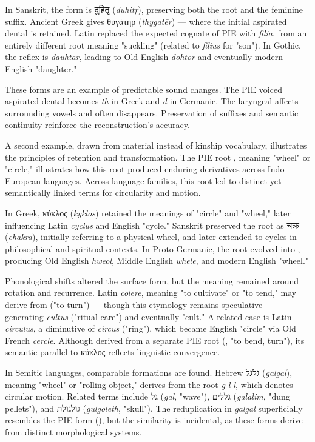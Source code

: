 In Sanskrit, the form is \textsanskrit{दुहितृ} (\emph{duhitṛ}), preserving both the root and the feminine suffix. Ancient Greek gives \textgreek{θυγάτηρ} (\emph{thygatēr}) — where the initial aspirated dental is retained. Latin replaced the expected cognate of PIE  with \emph{filia}, from an entirely different root meaning "suckling" (related to \emph{filius} for "son"). In Gothic, the reflex is \emph{dauhtar}, leading to Old English \emph{dohtor} and eventually modern English "daughter."

These forms are an example of predictable sound changes. The PIE voiced aspirated dental  becomes \emph{th} in Greek and \emph{d} in Germanic. The laryngeal  affects surrounding vowels and often disappears. Preservation of suffixes and semantic continuity reinforce the reconstruction's accuracy.

A second example, drawn from material instead of kinship vocabulary, illustrates the principles of retention and transformation. The PIE root , meaning "wheel" or "circle," illustrates how this root produced enduring derivatives across Indo-European languages. Across language families, this root led to distinct yet semantically linked terms for circularity and motion.

In Greek, \textgreek{κύκλος} (\emph{kyklos}) retained the meanings of "circle" and "wheel," later influencing Latin \emph{cyclus} and English "cycle." Sanskrit preserved the root as \textsanskrit{चक्र} (\emph{chakra}), initially referring to a physical wheel, and later extended to cycles in philosophical and spiritual contexts. In Proto-Germanic, the root evolved into , producing Old English \emph{hweol}, Middle English \emph{whele}, and modern English "wheel."

Phonological shifts altered the surface form, but the meaning remained around rotation and recurrence. Latin \emph{colere}, meaning "to cultivate" or "to tend," may derive from  ("to turn") — though this etymology remains speculative — generating \emph{cultus} ("ritual care") and eventually "cult." A related case is Latin \emph{circulus}, a diminutive of \emph{circus} ("ring"), which became English "circle" via Old French \emph{cercle}. Although derived from a separate PIE root (, "to bend, turn"), its semantic parallel to \textgreek{κύκλος} reflects linguistic convergence.

In Semitic languages, comparable formations are found. Hebrew \texthebrew{גלגל} (\emph{galgal}), meaning "wheel" or "rolling object," derives from the root \emph{g-l-l}, which denotes circular motion. Related terms include \texthebrew{גל} (\emph{gal}, "wave"), \texthebrew{גללים} (\emph{galalim}, "dung pellets"), and \texthebrew{גולגולת} (\emph{gulgoleth}, "skull"). The reduplication in \emph{galgal} superficially resembles the PIE form  (), but the similarity is incidental, as these forms derive from distinct morphological systems.

